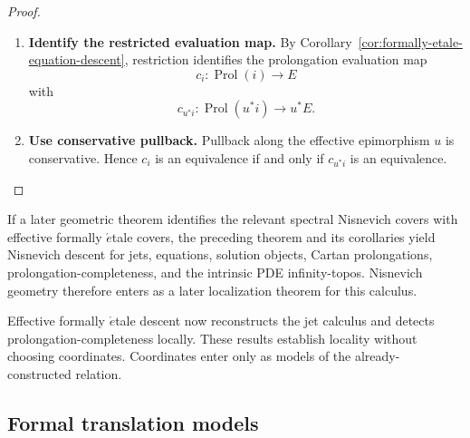 \begin{proof}
\leavevmode
\begin{enumerate}[label=\textup{(\arabic*)}]
    \item \textbf{Identify the restricted evaluation map.}
By Corollary~\ref{cor:formally-etale-equation-descent}, restriction identifies
the prolongation evaluation map
\[
  c_i:\operatorname{Prol}(i)\to E
\]
with
\[
  c_{u^*i}:\operatorname{Prol}(u^*i)\to u^*E.
\]

    \item \textbf{Use conservative pullback.}
Pullback along the effective epimorphism \(u\) is conservative. Hence
\(c_i\) is an equivalence if and only if \(c_{u^*i}\) is an equivalence.
\end{enumerate}
\end{proof}

\begin{remark}
If a later geometric theorem identifies the relevant spectral Nisnevich covers
with effective formally \(\acute{e}\)tale covers, the preceding theorem and its
corollaries yield Nisnevich descent for jets, equations, solution objects,
Cartan prolongations, prolongation-completeness, and the intrinsic PDE
infinity-topos. Nisnevich geometry therefore enters as a later localization theorem for this
calculus.
\end{remark}

Effective formally \(\acute{e}\)tale descent now reconstructs the jet
calculus and detects prolongation-completeness locally. These results establish
locality without choosing coordinates. Coordinates enter only as models of the
already-constructed relation.

\subsection{Formal translation models}
\label{sec:formal-translation}

